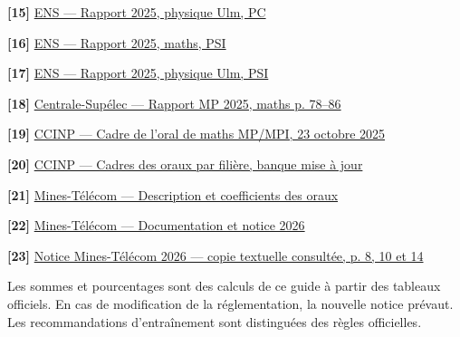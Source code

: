 \documentclass[10pt,a4paper]{article}
\newcommand{\note}[1]{\par{\small\color{muted}#1}\par}
\newcommand{\lien}[3]{\par\hypertarget{src:#1}{}\label{src:#1}\textbf{[#1]} \href{#3}{#2}\par}
\begin{document}
\lien{15}{ENS — Rapport 2025, physique Ulm, PC}{https://banques-ecoles.fr/cms/wp-content/uploads/2025/11/rapport_concours_2025_PC_physique_ULM.pdf}
\lien{16}{ENS — Rapport 2025, maths, PSI}{https://www.ens.psl.eu/sites/default/files/2025_psi_rapport_maths_oral.pdf}
\lien{17}{ENS — Rapport 2025, physique Ulm, PSI}{https://www.ens.psl.eu/sites/default/files/2025_psi_rapport_physiqueulm_oral.pdf}
\lien{18}{Centrale-Supélec — Rapport MP 2025, maths p. 78--86}{https://www.concours-centrale-supelec.fr/sites/default/files/documents/Rapports_Jury_2025_MP.pdf}
\lien{19}{CCINP — Cadre de l'oral de maths MP/MPI, 23 octobre 2025}{https://www.concours-commun-inp.fr/_resource/annales\%20\%C3\%A9crits/Cadre_Mathematiques\%20MP\%20MPI_23.10.25.pdf?download=true}
\lien{20}{CCINP — Cadres des oraux par filière, banque mise à jour}{https://www.concours-commun-inp.fr/fr/epreuves/les-epreuves-orales.html}
\lien{21}{Mines-Télécom — Description et coefficients des oraux}{https://www.concours-mines-telecom.fr/le-concours-mines-telecom/les-epreuves-orales/}
\lien{22}{Mines-Télécom — Documentation et notice 2026}{https://www.concours-mines-telecom.fr/documentation/}
\lien{23}{Notice Mines-Télécom 2026 — copie textuelle consultée, p. 8, 10 et 14}{https://fr.scribd.com/document/959006232/Notice-Telecom-2026-BD}
\endgroup
\vfill
\note{Les sommes et pourcentages sont des calculs de ce guide à partir des tableaux officiels. En cas de modification de la réglementation, la nouvelle notice prévaut. Les recommandations d'entraînement sont distinguées des règles officielles.}
\end{document}
